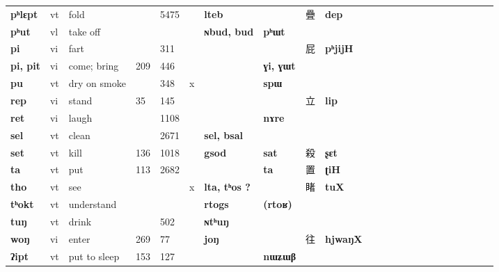 \documentclass[oldfontcommands,oneside,a4paper,11pt]{article}
\newcommand{\ipa}[1]{{\phon\textbf{#1}}}
\newcommand{\zh}[1]{{\cn #1}}
\begin{document}
\begin{table}[h]
{\begin{tabular}{lllllllllllllllllllllll}
\ipa{pʰlɛpt}   &  	vt   &  	fold   &  	\tiny    &  	\tiny 5475   &  	   &  	\ipa{lteb}   &  	\ipa{}   &  	\zh{疊}   &  	\ipa{dep}   \\  		
\ipa{pʰut}   &  	vl   &  	take off   &  	\tiny    &  	\tiny    &  	   &  	\ipa{ɴbud, bud}   &  	\ipa{pʰɯt}   &  	\zh{}   &  	\ipa{}   \\  		
\ipa{pi}   &  	vi   &  	fart   &  	\tiny    &  	\tiny 311   &  	   &  	\ipa{}   &  	\ipa{}   &  	\zh{屁}   &  	\ipa{pʰjijH}   \\  		
\ipa{pi, pit}   &  	vi   &  	come; bring   &  	\tiny 209   &  	\tiny 446   &  	   &  	\ipa{}   &  	\ipa{ɣi, ɣɯt}   &  	\zh{}   &  	\ipa{}   \\  		
\ipa{pu}   &  	vt   &  	dry on smoke   &  	\tiny    &  	\tiny 348   &  	x   &  	\ipa{}   &  	\ipa{spɯ}   &  	\zh{}   &  	\ipa{}   \\  		
\ipa{rep}   &  	vi   &  	stand   &  	\tiny 35   &  	\tiny 145   &  	   &  	\ipa{}   &  	\ipa{}   &  	\zh{立}   &  	\ipa{lip}   \\  		
\ipa{ret}   &  	vi   &  	laugh   &  	\tiny    &  	\tiny 1108   &  	   &  	\ipa{}   &  	\ipa{nɤre}   &  	\zh{}   &  	\ipa{}   \\  		
\ipa{sel}   &  	vt   &  	clean   &  	\tiny    &  	\tiny 2671   &  	   &  	\ipa{sel, bsal}   &  	\ipa{}   &  	\zh{}   &  	\ipa{}   \\  		
\ipa{set}   &  	vt   &  	kill   &  	\tiny 136   &  	\tiny 1018   &  	   &  	\ipa{gsod}   &  	\ipa{sat}   &  	\zh{殺}   &  	\ipa{ʂɛt}   \\  		
\ipa{ta}   &  	vt   &  	put   &  	\tiny 113   &  	\tiny 2682   &  	   &  	\ipa{}   &  	\ipa{ta}   &  	\zh{置}   &  	\ipa{ʈiH}   \\  		
\ipa{tho}   &  	vt   &  	see   &  	\tiny     &  	\tiny    &  	x   &  	\ipa{lta,  tʰos ?}   &  	\ipa{}   &  	\zh{睹}   &  	\ipa{tuX}   \\  		
\ipa{tʰokt}   &  	vt   &  	understand   &  	\tiny    &  	\tiny    &  	   &  	\ipa{rtogs}   &  	\ipa{(rtoʁ)}   &  	\zh{}   &  	\ipa{}   \\  		
\ipa{tuŋ}   &  	vt   &  	drink   &  	\tiny    &  	\tiny 502   &  	   &  	\ipa{ɴtʰuŋ}   &  	\ipa{}   &  	\zh{}   &  	\ipa{}   \\  		
\ipa{woŋ}   &  	vi   &  	enter   &  	\tiny 269   &  	\tiny 77   &  	   &  	\ipa{joŋ}   &  	\ipa{}   &  	\zh{往}   &  	\ipa{hjwaŋX}   \\  		
\ipa{ʔipt}   &  	vt   &  	put to sleep   &  	\tiny 153   &  	\tiny 127   &  	   &  	\ipa{}   &  	\ipa{nɯʑɯβ}   &  	\zh{}   &  	\ipa{}   \\  		
\bottomrule
\end{tabular}}
\end{table}
\end{document}
